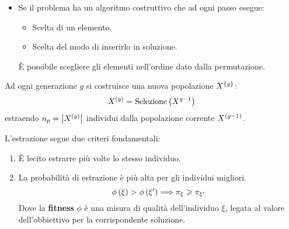 \documentclass[\main/main.tex]{subfiles}
\begin{document}
\begin{multicols}{2}
\begin{definition}
\begin{itemize}
        \item Se il problema ha un algoritmo costruttivo che ad ogni passo esegue:
        \begin{itemize}
            \item Scelta di un elemento.
            \item Scelta del modo di inserirlo in soluzione.
        \end{itemize}
        È possibile scegliere gli elementi nell'ordine dato dalla permutazione.
    \end{itemize}
\end{definition}
\begin{definition}[Selezione]
    Ad ogni generazione \(g\) si costruisce una nuova popolazione \(X^{\left\{g\right\}}\):
    \[
        X^{\left(g\right)} = \text{Selezione}\left(X^{g-1}\right)
    \]
    estraendo \(n_p = \left\lvert X^{\left(g\right)}\right\rvert\) individui dalla popolazione corrente \(X^{\left(g-1\right)}\).
    
    L'estrazione segue due criteri fondamentali:
    \begin{enumerate}
        \item È lecito estrarre più volte lo stesso individuo.
        \item La probabilità di estrazione è più alta per gli individui migliori.
        \[
            \phi\left(\xi\right) > \phi\left(\xi'\right) \Longrightarrow \pi_{\xi} \geqslant \pi_{\xi'}
        \]
        Dove la \textbf{fitness} \(\phi\) è una misura di qualità dell'individuo \(\xi\), legata al valore dell'obbiettivo per la corrispondente soluzione.
    \end{enumerate}
    

\end{definition}
\end{multicols}
\end{document}

